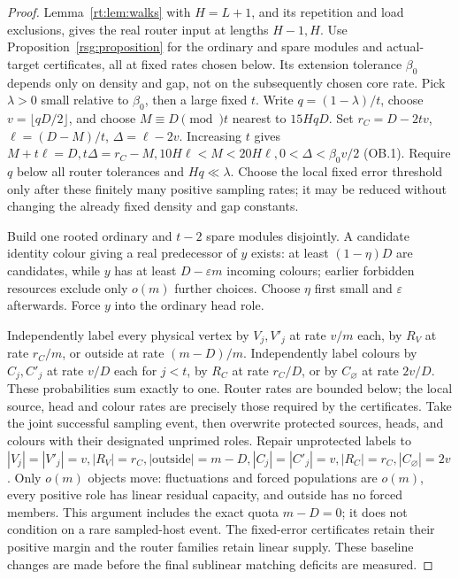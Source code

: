 \begin{proof}
Lemma~\ref{rt:lem:walks} with $H=L+1$, and its repetition and load exclusions, gives the real router input at lengths $H-1,H$. Use Proposition~\ref{rsg:proposition} for the
ordinary and spare modules and actual-target certificates, all at
fixed rates chosen below. Its extension tolerance $\beta_0$ depends only on density and gap, not on the subsequently chosen core rate.
Pick $\lambda>0$ small relative to $\beta_0$, then a large fixed $t$. Write $q=(1-\lambda)/t$, choose $v=\lfloor{}qD/2\rfloor$, and choose $M\equiv{}D\pmod{}t$ nearest to $15HqD$. Set $r_C=D-2tv$, $\ell=(D-M)/t$, $\Delta=\ell-2v$. Increasing $t$ gives $M+t\ell=D,t\Delta=r_C-M,10H\ell<M<20H\ell,0<\Delta<\beta_0v/2$ \textup{(OB.1)}. Require $q$ below all router tolerances and $Hq\ll\lambda$. Choose the local fixed error threshold only after these finitely
many positive sampling rates; it may be reduced without changing
the already fixed density and gap constants.

Build one rooted ordinary and $t-2$ spare modules disjointly. A candidate identity colour giving a real predecessor of $y$ exists: at least $(1-\eta)D$ are candidates, while $y$ has at least $D-\varepsilon{}m$ incoming colours; earlier forbidden resources exclude only $o(m)$ further choices. Choose $\eta$ first small and $\varepsilon$ afterwards. Force $y$ into the ordinary head role.

Independently label every physical vertex by $V_j,V'_j$ at rate $v/m$ each, by $R_V$ at rate $r_C/m$, or outside at rate $(m-D)/m$. Independently label colours by $C_j,C'_j$ at rate $v/D$ each for $j<t$, by $R_C$ at rate $r_C/D$, or by $C_\varnothing$ at rate $2v/D$. These probabilities sum exactly to one. Router rates are bounded below; the local source, head and colour rates are precisely
those required by the certificates. Take the joint successful
sampling event, then overwrite protected sources, heads, and colours
with their designated unprimed roles. Repair unprotected labels to $|V_j|=|V'_j|=v,|R_V|=r_C,|\mathrm{outside}|=m-D,|C_j|=|C'_j|=v,|R_C|=r_C,|C_\varnothing|=2v$. Only $o(m)$ objects move: fluctuations and forced populations are $o(m)$, every positive role has linear residual capacity, and outside has no forced members. This argument includes the exact quota $m-D=0$; it does not condition on a rare sampled-host event. The fixed-error certificates retain their positive margin and the router
families retain linear supply. These baseline changes are made before
the final sublinear matching deficits are measured.


\end{proof}
